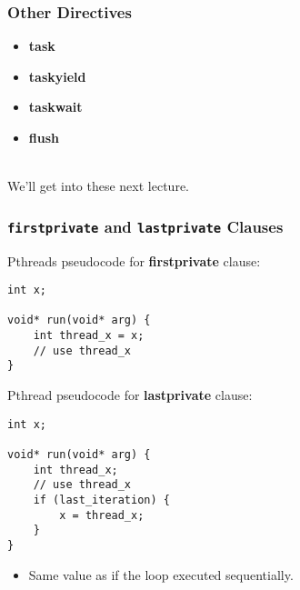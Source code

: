 \documentclass[aspectratio=43]{beamer}
\newenvironment{changemargin}[1]{%
  \begin{list}{}{%
    \setlength{\topsep}{0pt}%
    \setlength{\leftmargin}{#1}%
    \setlength{\rightmargin}{1em}
    \setlength{\listparindent}{\parindent}%
    \setlength{\itemindent}{\parindent}%
    \setlength{\parsep}{\parskip}%
  }%
  \item[]}{\end{list}}
\begin{document}
\begin{frame}[fragile]
  \frametitle{Other Directives}

  \begin{changemargin}{2.5cm}

  \begin{itemize}
    \item {\bf task}
    \item {\bf taskyield}
    \item {\bf taskwait}
    \item {\bf flush}
  \end{itemize}
  ~\\[1em]
  We'll get into these next lecture.
  \end{changemargin}

\end{frame}

\begin{frame}[fragile]
  \frametitle{{\tt firstprivate} and {\tt lastprivate} Clauses}

  \begin{changemargin}{2.5cm}

  Pthreads pseudocode for {\bf firstprivate} clause:
  \begin{lstlisting}
int x;

void* run(void* arg) {
    int thread_x = x;
    // use thread_x
}
  \end{lstlisting}

  Pthread pseudocode for {\bf lastprivate} clause:
  \begin{lstlisting}
int x;

void* run(void* arg) {
    int thread_x;
    // use thread_x
    if (last_iteration) {
        x = thread_x;
    }
}
  \end{lstlisting}

  \begin{itemize}
    \item Same value as if the loop executed sequentially.
  \end{itemize}
  \end{changemargin}

\end{frame}
\end{document}
